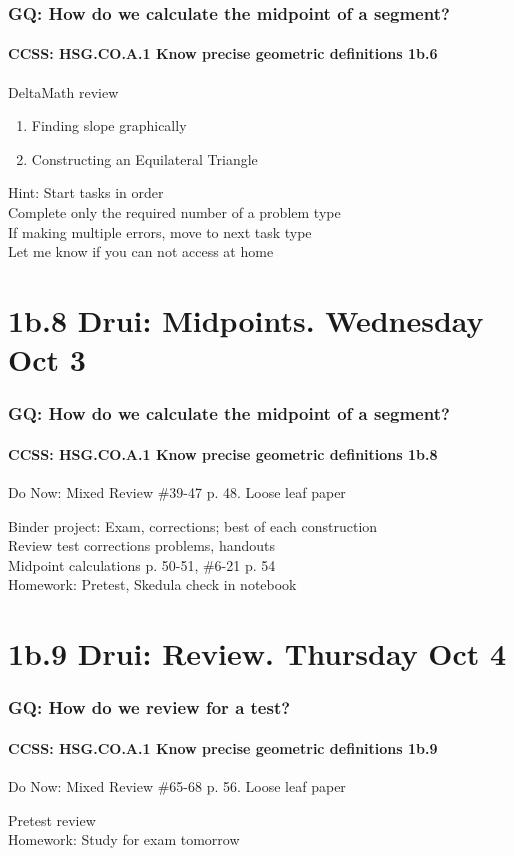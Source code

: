 \documentclass{beamer}
\begin{document}
  \frame
    {
      \frametitle{GQ: How do we calculate the midpoint of a segment?}
      \framesubtitle{CCSS: HSG.CO.A.1 Know precise geometric definitions  \alert{1b.6}}

      \begin{block}{DeltaMath review}
        \begin{enumerate}
            \item Finding slope graphically
            \item Constructing an Equilateral Triangle
        \end{enumerate}
      \end{block}
      Hint: Start tasks in order\\
      Complete only the required number of a problem type\\
      If making multiple errors, move to next task type\\
      \vspace{0.5cm}
      Let me know if you can not access at home
    }


\section{1b.8 Drui: Midpoints. Wednesday Oct 3}
  \frame
  {
    \frametitle{GQ: How do we calculate the midpoint of a segment?}
    \framesubtitle{CCSS: HSG.CO.A.1 Know precise geometric definitions  \alert{1b.8}}

    \begin{block}{Do Now: Mixed Review \#39-47 p. 48. Loose leaf paper}
    \end{block}
    Binder project: Exam, corrections; best of each construction\\
    Review test corrections problems, handouts\\
    Midpoint calculations p. 50-51, \#6-21 p. 54\\
    \vspace{0.5cm}
    Homework: Pretest, Skedula check in notebook
  }

\section{1b.9 Drui: Review. Thursday Oct 4}
\frame
{
  \frametitle{GQ: How do we review for a test?}
  \framesubtitle{CCSS: HSG.CO.A.1 Know precise geometric definitions  \alert{1b.9}}

  \begin{block}{Do Now: Mixed Review \#65-68 p. 56. Loose leaf paper}
  \end{block}
  Pretest review\\
  \vspace{0.5cm}
  Homework: Study for \alert{exam tomorrow}
}
\end{document}
